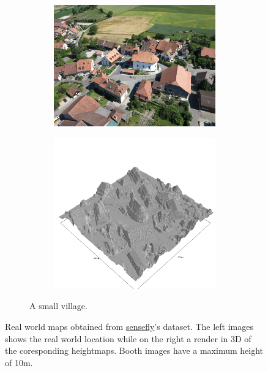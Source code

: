 \documentclass[../document.tex]{subfiles}
\begin{document}
\begin{figure}[htbp]
\begin{subfigure}[b]{1\textwidth}
\begin{subfigure}[b]{0.45\textwidth}
        \includegraphics[width=\textwidth]{../img/sullens-real.jpg}
    \end{subfigure}  
    \begin{subfigure}[b]{0.45\textwidth}
        \includegraphics[width=\textwidth]{../img/hm3d_borders/sullens.png}
    \end{subfigure} 
    \caption{A small village.} 
\end{subfigure}
\caption{Real world maps obtained from \href{https://www.sensefly.com/education/datasets/}{sensefly}'s dataset. The left images shows the real world location while on the right a render in 3D of the coresponding heightmaps. Booth images have a maximum height of 10m.}  
\label{fig : real-maps}
\end{figure}
\end{document}

